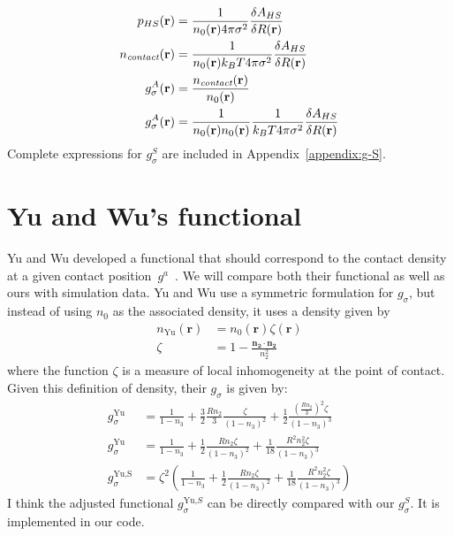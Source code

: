 \documentclass[letterpaper,twocolumn,amsmath,amssymb,jcp,10pt,aip]{revtex4-1}
\newcommand{\rr}{\textbf{r}}
\begin{document}
{\begin{align}
  p_{HS}(\mathbf{r}) &= \frac{1}{n_0(\rr) 4\pi \sigma^2} \frac{\delta
    A_{HS}}{\delta R(\mathbf{r})} \label{eq:p_{HS}^S}\\
  \ncontact(\rr) &= \frac{1}{n_0(\rr) k_BT 4\pi \sigma^2} \frac{\delta
    A_{HS}}{\delta R(\mathbf{r})} \\
  g_\sigma^A(\rr) &= \frac{\ncontact(\rr)}{n_0(\rr)} \\
  g_\sigma^A(\rr) &= \frac{1}{n_0(\rr) n_0(\rr)}\frac{1}{ k_BT 4\pi \sigma^2} \frac{\delta
    A_{HS}}{\delta R(\mathbf{r})} \label{eq:g-A-exact}
\end{align}}Complete expressions for $g_\sigma^S$ are included in
Appendix~\ref{appendix:g-S}.\\

\section{Yu and Wu's functional}\label{sec:yuwu}

Yu and Wu developed a functional that should correspond to the contact
density at a given contact
position~$g^a$~\cite{yu2002fmt-dft-inhomogeneous-associating}.  We
will compare both their functional as well as ours with simulation
data.  Yu and Wu use a symmetric formulation for $g_\sigma$, but
instead of using $n_0$ as the associated density, it uses a density
given by
\begin{align}
  n_\text{Yu}(\rr) &= n_0(\rr) \zeta(\rr) \\
  \zeta &= 1 - \frac{\mathbf{n_2}\cdot\mathbf{n_2}}{n_2^2}
\end{align}
where the function $\zeta$ is a measure of local inhomogeneity at the
point of contact.  Given this definition of density, their $g_\sigma$ is
given by:
\begin{align}
  g_\sigma^\text{Yu} &= \frac{1}{1-n_3}
    + \frac32 \frac{R n_2}{3}\frac{\zeta}{(1-n_3)^2}
    + \frac12 \frac{\left(\frac{R n_2}{3}\right)^2 \zeta}{(1-n_3)^3}
    \\
  g_\sigma^\text{Yu} &= \frac{1}{1-n_3}
    + \frac12 \frac{R n_2\zeta}{(1-n_3)^2}
    + \frac1{18} \frac{R^2 n_2^2 \zeta}{(1-n_3)^3}
    \\
  g_\sigma^\text{Yu,S} &= \zeta^2\left(\frac{1}{1-n_3}
    + \frac12 \frac{R n_2\zeta}{(1-n_3)^2}
    + \frac1{18} \frac{R^2 n_2^2 \zeta}{(1-n_3)^3}\right)
\end{align}
I think the adjusted functional $g_\sigma^{\text{Yu,}S}$ can be directly
compared with our $g_\sigma^S$.  It is implemented in our code.
\end{document}
